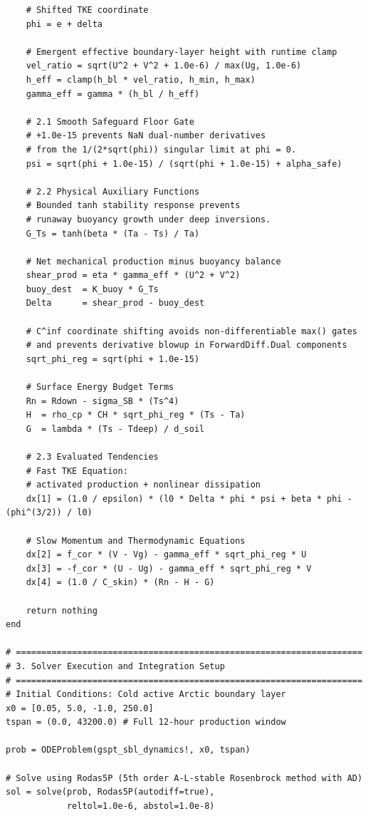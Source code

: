 \documentclass[11pt,letterpaper]{article}
\begin{document}
\begin{verbatim}
    # Shifted TKE coordinate
    phi = e + delta

    # Emergent effective boundary-layer height with runtime clamp
    vel_ratio = sqrt(U^2 + V^2 + 1.0e-6) / max(Ug, 1.0e-6)
    h_eff = clamp(h_bl * vel_ratio, h_min, h_max)
    gamma_eff = gamma * (h_bl / h_eff)

    # 2.1 Smooth Safeguard Floor Gate
    # +1.0e-15 prevents NaN dual-number derivatives
    # from the 1/(2*sqrt(phi)) singular limit at phi = 0.
    psi = sqrt(phi + 1.0e-15) / (sqrt(phi + 1.0e-15) + alpha_safe)

    # 2.2 Physical Auxiliary Functions
    # Bounded tanh stability response prevents
    # runaway buoyancy growth under deep inversions.
    G_Ts = tanh(beta * (Ta - Ts) / Ta)

    # Net mechanical production minus buoyancy balance
    shear_prod = eta * gamma_eff * (U^2 + V^2)
    buoy_dest  = K_buoy * G_Ts
    Delta      = shear_prod - buoy_dest

    # C^inf coordinate shifting avoids non-differentiable max() gates
    # and prevents derivative blowup in ForwardDiff.Dual components
    sqrt_phi_reg = sqrt(phi + 1.0e-15)

    # Surface Energy Budget Terms
    Rn = Rdown - sigma_SB * (Ts^4)
    H  = rho_cp * CH * sqrt_phi_reg * (Ts - Ta)
    G  = lambda * (Ts - Tdeep) / d_soil

    # 2.3 Evaluated Tendencies
    # Fast TKE Equation:
    # activated production + nonlinear dissipation
    dx[1] = (1.0 / epsilon) * (l0 * Delta * phi * psi + beta * phi - (phi^(3/2)) / l0)

    # Slow Momentum and Thermodynamic Equations
    dx[2] = f_cor * (V - Vg) - gamma_eff * sqrt_phi_reg * U
    dx[3] = -f_cor * (U - Ug) - gamma_eff * sqrt_phi_reg * V
    dx[4] = (1.0 / C_skin) * (Rn - H - G)

    return nothing
end

# ====================================================================
# 3. Solver Execution and Integration Setup
# ====================================================================
# Initial Conditions: Cold active Arctic boundary layer
x0 = [0.05, 5.0, -1.0, 250.0]
tspan = (0.0, 43200.0) # Full 12-hour production window

prob = ODEProblem(gspt_sbl_dynamics!, x0, tspan)

# Solve using Rodas5P (5th order A-L-stable Rosenbrock method with AD)
sol = solve(prob, Rodas5P(autodiff=true),
            reltol=1.0e-6, abstol=1.0e-8)
\end{verbatim}
\endgroup
\end{document}
